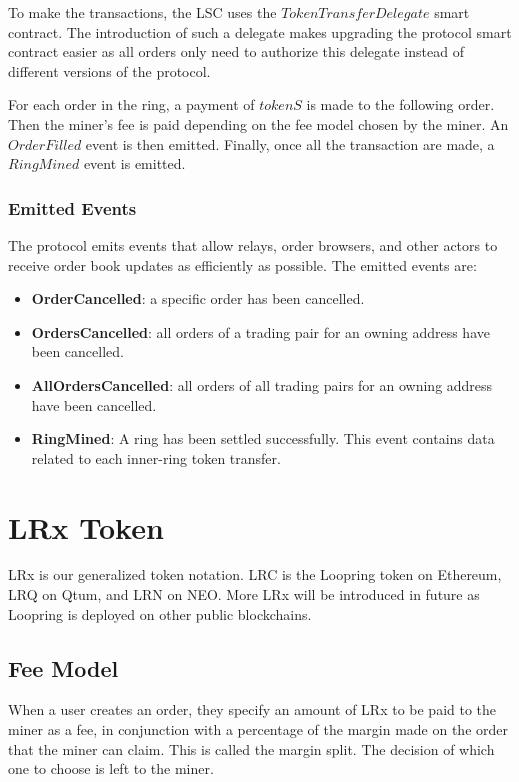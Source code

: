 \documentclass[UTF8,nofonts]{article}
\begin{document}
To make the transactions, the LSC uses the $TokenTransferDelegate$ smart contract. The introduction of such a delegate makes upgrading the protocol smart contract easier as all orders only need to authorize this delegate instead of different versions of the protocol.

For each order in the ring, a payment of $tokenS$ is made to the following order. Then the miner's fee is paid depending on the fee model chosen by the miner. An $OrderFilled$ event is then emitted. Finally, once all the transaction are made, a $RingMined$ event is emitted.

\subsubsection{Emitted Events}

The protocol emits events that allow relays, order browsers, and other actors to receive order book updates as efficiently as possible. The emitted events are:

\begin{itemize}
	\item \textbf{OrderCancelled}: a specific order has been cancelled.
	\item \textbf{OrdersCancelled}: all orders of a trading pair for an owning address have been cancelled.
	\item \textbf{AllOrdersCancelled}: all orders of all trading pairs for an owning address have been cancelled.	
	\item \textbf{RingMined}: A ring has been settled successfully. This event contains data related to each inner-ring token transfer.
\end{itemize}


\section{LRx Token}
LRx is our generalized token notation. LRC is the Loopring token on Ethereum, LRQ on Qtum, and LRN on NEO. More LRx will be introduced in future as Loopring is deployed on other public blockchains.

\subsection{Fee Model} 
When a user creates an order, they specify an amount of LRx to be paid to the miner as a fee, in conjunction with a percentage of the margin made on the order that the miner can claim. This is called the margin split. The decision of which one to choose is left to the miner.
\end{document}
